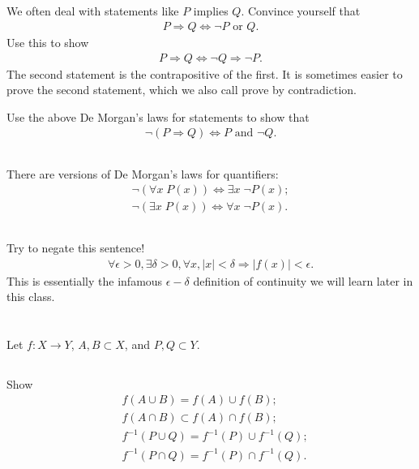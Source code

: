 \documentclass[11pt,letterpaper]{article}
\begin{document}
\subsection{}
We often deal with statements like $P$ implies $Q$. Convince yourself that 
\begin{align}
    P \Rightarrow Q \Leftrightarrow \neg P \text{ or } Q.
\end{align}
Use this to show 
\begin{align}
    P \Rightarrow Q \Leftrightarrow \neg Q \Rightarrow \neg P.
\end{align}
The second statement is the contrapositive of the first. It is sometimes easier to prove the second statement, which we also call prove by contradiction. 

Use the above De Morgan's laws for statements to show that 
\begin{align}
    \neg (P \Rightarrow Q) \Leftrightarrow P \text{ and } \neg Q.
\end{align}

\subsection{}
There are versions of De Morgan's laws for quantifiers: 
\begin{align}
    \neg ( \forall x\;P(x) ) \Leftrightarrow \exists x\;\neg P(x);\\
    \neg ( \exists x\;P(x) ) \Leftrightarrow \forall x\;\neg P(x).
\end{align}

\subsection{}
Try to negate this sentence!
\begin{align}
    \forall \epsilon>0, \exists \delta>0, \forall x, |x|<\delta \Rightarrow |f(x)|<\epsilon.
\end{align}
This is essentially the infamous $\epsilon-\delta$ definition of continuity we will learn later in this class.

\section{}
Let $f: X\to Y$, $A, B\subset X$, and $P, Q\subset Y$. 

\subsection{}
Show
\begin{align}
    &f(A\cup B) = f(A)\cup f(B);\\
    &f(A\cap B) \subset f(A)\cap f(B);\\
    &f^{-1}(P\cup Q) = f^{-1}(P)\cup f^{-1}(Q);\\
    &f^{-1}(P\cap Q) = f^{-1}(P)\cap f^{-1}(Q).
\end{align}
\end{document}
